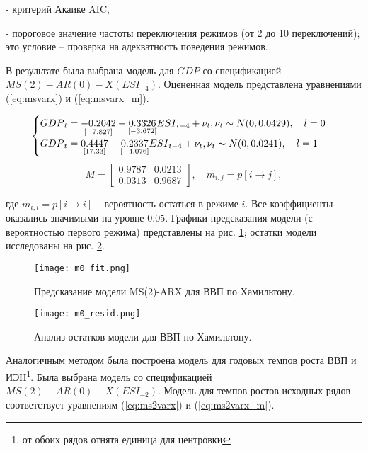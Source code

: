 \documentclass[a4paper,14pt]{extreport}
\begin{document}
	- критерий Акаике AIC,
	
	- пороговое значение частоты переключения режимов (от 2 до 10 переключений); это условие -- проверка на адекватность поведения режимов.
	
	В результате была выбрана модель для ${GDP}$ со спецификацией $MS(2)-AR(0)-X({ESI}_{-4})$. Оцененная модель представлена уравнениями (\ref{eq:msvarx}) и (\ref{eq:msvarx_m}).
	
	{
		
		\begin{equation}
		\begin{cases}
		{GDP}_{t} = 
		\underset{[-7.827]}{-0.2042} 
		- \underset{[-3.672]}{0.3326} {ESI}_{t-4}
		+ \nu_{t} , \space \nu_{t} \sim N(0, 0.0429)
		, \quad l=0 \\
		{GDP}_{t} = 
		\underset{[17.33]}{0.4447}
		- \underset{[-4.076]}{0.2337} {ESI}_{t-4}
		+ \nu_{t} , \space \nu_{t} \sim N(0, 0.0241)
		, \quad l=1
		\end{cases}			
		\label{eq:msvarx}
		\end{equation}
		\begin{equation}
		M = 
		\begin{bmatrix}
		0.9787 & 0.0213 \\
		0.0313 & 0.9687
		\end{bmatrix}
		, \quad m_{i,j} = p[i \rightarrow j],
		\label{eq:msvarx_m}
		\end{equation}
		
	}
	
	где $m_{i,i} = p[i \rightarrow i]$ -- вероятность остаться в режиме $i$. Все коэффициенты оказались значимыми на уровне $0.05$. Графики предсказания модели (с вероятностью первого режима) представлены на рис. \ref{fig:hp-fitcompare}; остатки модели исследованы на рис. \ref{fig:hp-residcomp}.
	
	{
		\begin{figure}
			\texttt{[image: m0\_fit.png]}
			\caption{Предсказание модели MS(2)-ARX для ВВП по Хамильтону.}
			\label{fig:hp-fitcompare}
		\end{figure}
		\begin{figure}
			\texttt{[image: m0\_resid.png]}
			\caption{Анализ остатков модели для ВВП по Хамильтону.}
			\label{fig:hp-residcomp}
		\end{figure}
	}
	
	
	Аналогичным методом была построена модель для годовых темпов роста ВВП и ИЭН\footnote{от обоих рядов отнята единица для центровки}. Была выбрана модель со спецификацией $MS(2)-AR(0)-X({ESI}_{-2})$. Модель для темпов ростов исходных рядов соответствует уравнениям (\ref{eq:ms2varx}) и (\ref{eq:ms2varx_m}).
	
\end{document}
